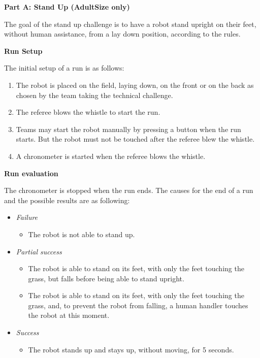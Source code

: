 \clearpage
\sffamily
{\bfseries \color[rgb]{0.4,0.4,0.4} Part A: Stand Up (AdultSize only)}
{}


\bigskip

The goal of the stand up challenge is to have a robot stand upright on their feet, without human assistance, from a lay down position, according to the rules.

\bigskip

{\bfseries Run Setup}

\smallskip

The initial setup of a run is as follows:

\begin{enumerate}

\item The robot is placed on the field, laying down, on the front or on the back as chosen by the team taking the technical challenge.

\item The referee blows the whistle to start the run.

\item Teams may start the robot manually by pressing a button when the run starts. But the robot must not be touched after the referee blew the whistle. 

\item A chronometer is started when the referee blows the whistle.
\end{enumerate}

{\bfseries Run evaluation}

\smallskip

The chronometer is stopped when the run ends. The causes for the end of a run and
the possible results are as following:
\begin{itemize}
\item \textit{Failure}
  \begin{itemize}
    \item The robot is not able to stand up.
     \end{itemize}
\item \textit{Partial success}
  \begin{itemize}
    \item The robot is able to stand on its feet, with only the feet touching the grass, but falls before being able to stand upright.
    \item The robot is able to stand on its feet, with only the feet touching the grass, and, to prevent the robot from falling, a human handler touches the robot at this moment.
  \end{itemize}
\item \textit{Success}
  \begin{itemize}
    \item The robot stands up and stays up, without moving, for 5 seconds.
  \end{itemize}
\end{itemize}

